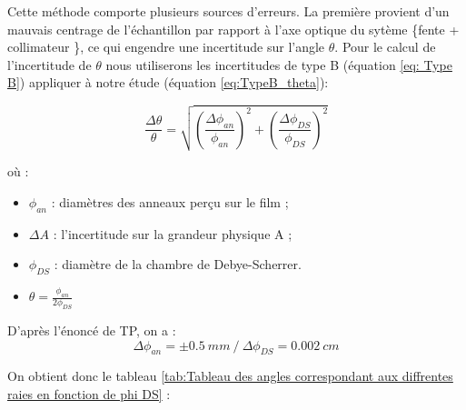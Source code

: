 Cette méthode comporte plusieurs sources d'erreurs. La première provient d'un mauvais centrage de l'échantillon par rapport à l'axe optique du sytème \{fente + collimateur \}, ce qui engendre une incertitude sur l'angle $\theta$.
Pour le calcul de l'incertitude de $\theta$ nous utiliserons les incertitudes de type B (équation \ref{eq: Type B}) appliquer à notre étude (équation \ref{eq:TypeB_theta}):

\begin{equation}\label{eq:TypeB_theta}
	\frac{\Delta \theta}{\theta} = \sqrt{\left ( \frac{\Delta \phi_{an}}{\phi_{an}} \right )^2 + \left ( \frac{\Delta \phi_{DS}}{\phi_{DS}} \right )^2 }
\end{equation}

où :

\begin{itemize}
	\item $\phi_{an}$ : diamètres des anneaux perçu sur le film ;
	
	\item $\Delta A$ : l'incertitude sur la grandeur physique A ;
	

	
	\item $\phi_{DS}$ : diamètre de la chambre de Debye-Scherrer.
	
	\item $\theta = \frac{\phi_{an}}{2\phi_{DS}}$
\end{itemize}

D'après l'énoncé de TP, on a :
\begin{equation}
	\Delta \phi_{an} = \pm 0.5 \ mm  \ / \ \Delta \phi_{DS} = 0.002 \ cm
\end{equation}

On obtient donc le tableau \ref{tab:Tableau des angles correspondant aux diffrentes raies en fonction de phi DS} : 










